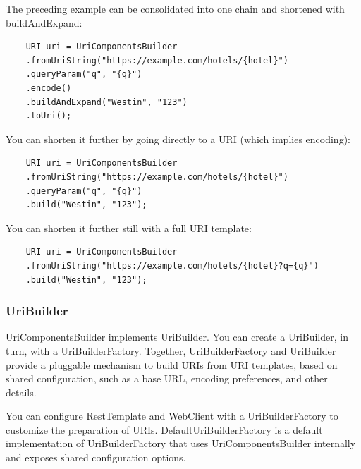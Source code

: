 \documentclass{scrartcl}
\begin{document}
The preceding example can be consolidated into one chain and shortened with buildAndExpand:

\begin{lstlisting}
    URI uri = UriComponentsBuilder
    .fromUriString("https://example.com/hotels/{hotel}")
    .queryParam("q", "{q}")
    .encode()
    .buildAndExpand("Westin", "123")
    .toUri();

\end{lstlisting}

You can shorten it further by going directly to a URI (which implies encoding):

\begin{lstlisting}
    URI uri = UriComponentsBuilder
    .fromUriString("https://example.com/hotels/{hotel}")
    .queryParam("q", "{q}")
    .build("Westin", "123");

\end{lstlisting}

You can shorten it further still with a full URI template:

\begin{lstlisting}
    URI uri = UriComponentsBuilder
    .fromUriString("https://example.com/hotels/{hotel}?q={q}")
    .build("Westin", "123");
\end{lstlisting}

\subsubsection{UriBuilder}

UriComponentsBuilder implements UriBuilder. You can create a UriBuilder, in turn, with a UriBuilderFactory. Together, UriBuilderFactory and UriBuilder provide a pluggable mechanism to build URIs from URI templates, based on shared configuration, such as a base URL, encoding preferences, and other details.

You can configure RestTemplate and WebClient with a UriBuilderFactory to customize the preparation of URIs. DefaultUriBuilderFactory is a default implementation of UriBuilderFactory that uses UriComponentsBuilder internally and exposes shared configuration options.
\end{document}
